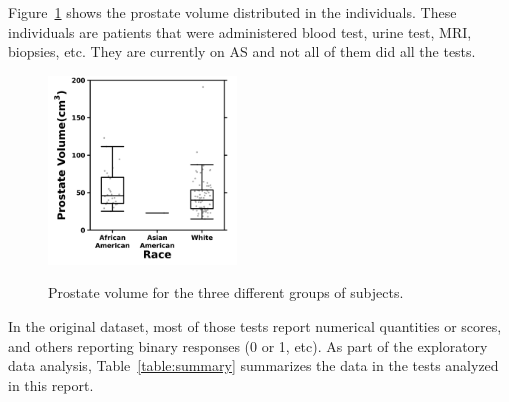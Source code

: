 \documentclass[]{article}
\begin{document}
\noindent Figure~\ref{fig:basic2} shows the prostate volume distributed in the individuals. These individuals 
are patients that were administered blood test, urine test, MRI, biopsies, etc. They are currently on 
AS and not all of them did all the tests.  \\

\begin{figure}
\centering
    \includegraphics[width=50mm]{png/prostate_volume.png} \\
\caption{Prostate volume for the three different groups of subjects.}
\label{fig:basic2}
\end{figure}

\noindent In the original dataset, most of those tests report numerical quantities or scores, and others  
reporting binary responses (0 or 1, etc). As part of the exploratory data analysis, Table~\ref{table:summary} summarizes 
the data in the tests analyzed in this report. \\
\end{document}
